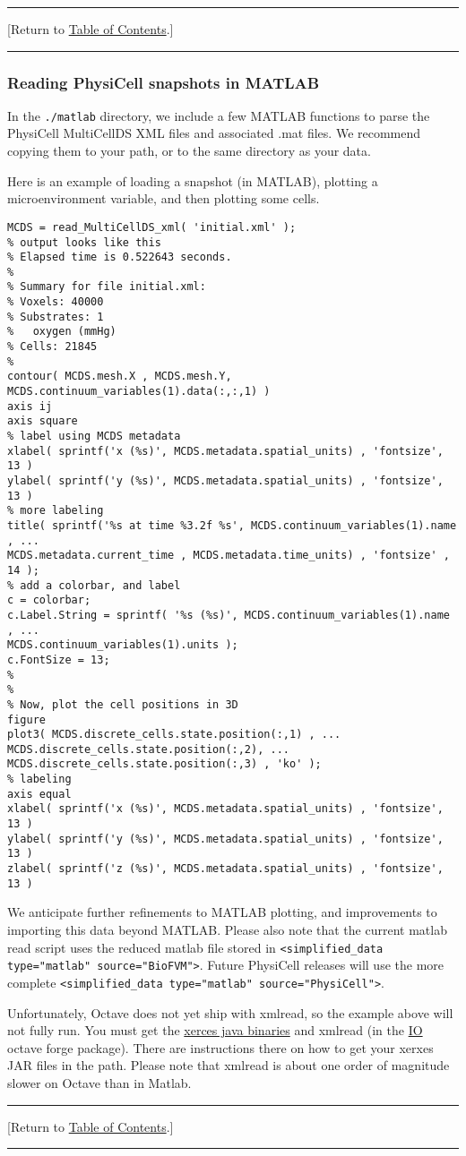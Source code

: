 \documentclass[12pt]{article}
\renewcommand{\v}{\verb}
\newcommand{\TOClink}{\begin{center}\hrule\vskip-5pt\phantom{.}\hfill[Return to \hyperlink{TOC}{Table of Contents}.]\hfill\phantom{.}\vskip3pt\hrule\end{center}}
\begin{document}
\TOClink 

\subsubsection{Reading PhysiCell snapshots in MATLAB}
\label{sec:matlab_data}
In the \v|./matlab| directory, we include a few MATLAB functions to 
parse the PhysiCell MultiCellDS XML files and associated .mat files. 
We recommend copying them to your path, or to the same directory as 
your data. 

Here is an example of loading a snapshot (in MATLAB), 
plotting a microenvironment variable, and then plotting some cells. 
\begin{verbatim}
MCDS = read_MultiCellDS_xml( 'initial.xml' );
% output looks like this
% Elapsed time is 0.522643 seconds.
% 
% Summary for file initial.xml:
% Voxels: 40000
% Substrates: 1
%   oxygen (mmHg)
% Cells: 21845
%
contour( MCDS.mesh.X , MCDS.mesh.Y, MCDS.continuum_variables(1).data(:,:,1) )
axis ij
axis square
% label using MCDS metadata 
xlabel( sprintf('x (%s)', MCDS.metadata.spatial_units) , 'fontsize', 13 )
ylabel( sprintf('y (%s)', MCDS.metadata.spatial_units) , 'fontsize', 13 )
% more labeling 
title( sprintf('%s at time %3.2f %s', MCDS.continuum_variables(1).name , ...
MCDS.metadata.current_time , MCDS.metadata.time_units) , 'fontsize' , 14 );
% add a colorbar, and label 
c = colorbar; 
c.Label.String = sprintf( '%s (%s)', MCDS.continuum_variables(1).name , ...
MCDS.continuum_variables(1).units ); 
c.FontSize = 13; 
%
%
% Now, plot the cell positions in 3D
figure
plot3( MCDS.discrete_cells.state.position(:,1) , ... 
MCDS.discrete_cells.state.position(:,2), ...
MCDS.discrete_cells.state.position(:,3) , 'ko' ); 
% labeling 
axis equal 
xlabel( sprintf('x (%s)', MCDS.metadata.spatial_units) , 'fontsize', 13 )
ylabel( sprintf('y (%s)', MCDS.metadata.spatial_units) , 'fontsize', 13 )
zlabel( sprintf('z (%s)', MCDS.metadata.spatial_units) , 'fontsize', 13 )
\end{verbatim}

We anticipate further refinements to MATLAB plotting, and 
improvements to importing this data beyond MATLAB. Please also note 
that the current matlab read script uses the reduced matlab 
file stored in \v|<simplified_data type="matlab" source="BioFVM">|. 
Future PhysiCell releases will use the more complete 
\v|<simplified_data type="matlab" source="PhysiCell">|.

Unfortunately, Octave does not yet ship with xmlread, so the example 
above will not fully run. You must get the 
\href{http://xerces.apache.org/xerces-j/}{xerces java binaries} and 
xmlread (in the \href{https://octave.sourceforge.io/io/index.html}{IO} octave forge package). 
There are instructions there on how to get your xerxes JAR files in 
the path. Please note that xmlread is about one order of magnitude slower on 
Octave than in Matlab. 
\TOClink 
\end{document}
